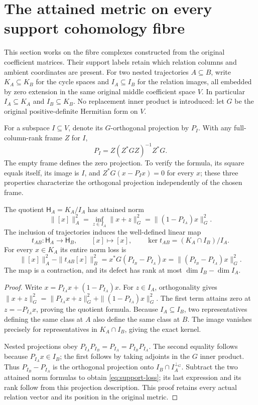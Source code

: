 \section{The attained metric on every support cohomology fibre}
\label{sec:support-quotient-metric}
This section works on the fibre complexes constructed from the original coefficient matrices. Their support labels retain which relation columns and ambient coordinates are present. For two nested trajectories $A\subseteq B$, write $K_A\subseteq K_B$ for the cycle spaces and $I_A\subseteq I_B$ for the relation images, all embedded by zero extension in the same original middle coefficient space $V$. In particular $I_A\subseteq K_A$ and $I_B\subseteq K_B$. No replacement inner product is introduced: let $G$ be the original positive-definite Hermitian form on $V$.

For a subspace $I\subseteq V$, denote its $G$-orthogonal projection by $P_I$. With any full-column-rank frame $Z$ for $I$,
\begin{equation}\label{eq:original-relation-projection}
 P_I=Z(Z^*GZ)^{-1}Z^*G.
\end{equation}
The empty frame defines the zero projection. To verify the formula, its square equals itself, its image is $I$, and $Z^*G(x-P_Ix)=0$ for every $x$; these three properties characterize the orthogonal projection independently of the chosen frame.

\begin{theorem}\label{thm:support-metric-transport}
The quotient $\mathsf H_A=K_A/I_A$ has attained norm
\[
 \|[x]\|_A^2=\inf_{z\in I_A}\|x+z\|_G^2
 =\|(1-P_{I_A})x\|_G^2.
\]
The inclusion of trajectories induces the well-defined linear map
\[
 t_{AB}:\mathsf H_A\to\mathsf H_B,\qquad[x]\mapsto[x],
 \qquad\ker t_{AB}=(K_A\cap I_B)/I_A.
\]
For every $x\in K_A$ its entire norm loss is
\begin{equation}\label{eq:support-loss}
 \|[x]\|_A^2-\|t_{AB}[x]\|_B^2
 =x^*G(P_{I_B}-P_{I_A})x
 =\|(P_{I_B}-P_{I_A})x\|_G^2.
\end{equation}
The map is a contraction, and its defect has rank at most $\dim I_B-\dim I_A$.
\end{theorem}
\begin{proof}
Write $x=P_{I_A}x+(1-P_{I_A})x$. For $z\in I_A$, orthogonality gives
$\|x+z\|_G^2=\|P_{I_A}x+z\|_G^2+\|(1-P_{I_A})x\|_G^2$.
The first term attains zero at $z=-P_{I_A}x$, proving the quotient formula. Because $I_A\subseteq I_B$, two representatives defining the same class at $A$ also define the same class at $B$. The image vanishes precisely for representatives in $K_A\cap I_B$, giving the exact kernel.

Nested projections obey $P_{I_A}P_{I_B}=P_{I_A}=P_{I_B}P_{I_A}$. The second equality follows because $P_{I_A}x\in I_B$; the first follows by taking adjoints in the $G$ inner product. Thus $P_{I_B}-P_{I_A}$ is the orthogonal projection onto $I_B\cap I_A^{\perp_G}$. Subtract the two attained norm formulas to obtain \eqref{eq:support-loss}; its last expression and its rank follow from this projection description. This proof retains every actual relation vector and its position in the original metric.
\end{proof}

